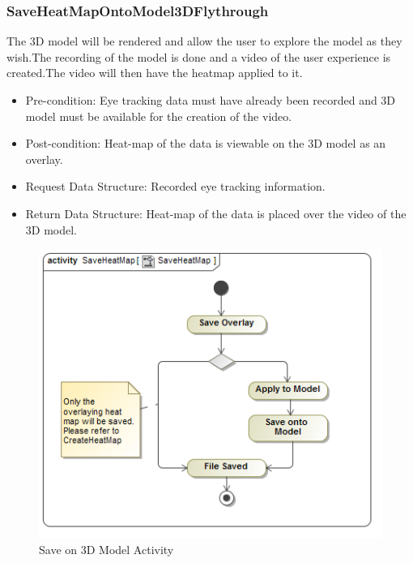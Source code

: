	\subsubsection{SaveHeatMapOntoModel3DFlythrough}
	The 3D model will be rendered and allow the user to explore the model as they wish.The recording of the  	model is done and a video of the user experience is created.The video will then have the heatmap 			applied to it. 
	\begin{itemize}
		\item Pre-condition: Eye tracking data must have already been recorded and 3D model must be available for the creation of the video.
		\item Post-condition: Heat-map of the data is viewable on the 3D model as an overlay.
		\item Request Data Structure: Recorded eye tracking information.
		\item Return Data Structure: Heat-map of the data is placed over the video of the 3D model.
	\end{itemize}
	\begin{figure}[!ht]
		\centering	
		\includegraphics[scale=0.5,width=15cm,keepaspectratio]{Diagrams/Activity_Diagram__SaveHeatMap__SaveHeatMap.png}	
		\caption{Save on 3D Model Activity}
	\end{figure}
	
